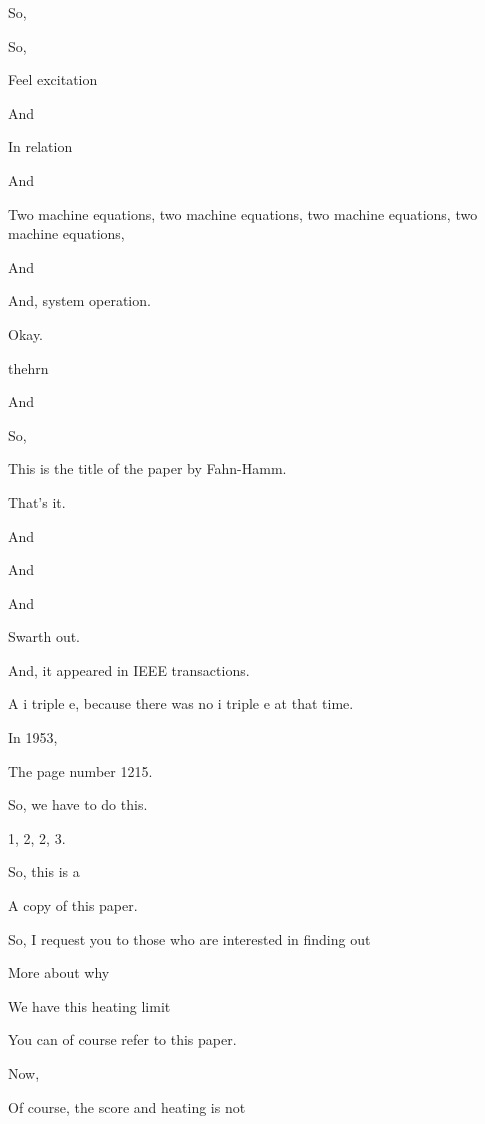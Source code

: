 \documentclass{article}
\begin{document}
So,

So,

Feel excitation

And

In relation

And

Two machine equations, two machine equations, two machine equations, two machine equations,

And

And, system operation.

Okay.

thehrn

And

So,

This is the title of the paper by Fahn-Hamm.

That's it.

And

And

And

Swarth out.

And, it appeared in IEEE transactions.

A i triple e, because there was no i triple e at that time.

In 1953,

The page number 1215.

So, we have to do this.

1, 2, 2, 3.



So, this is a

A copy of this paper.

So, I request you to those who are interested in finding out

More about why

We have this heating limit

You can of course refer to this paper.

Now,

Of course, the score and heating is not
\end{document}

